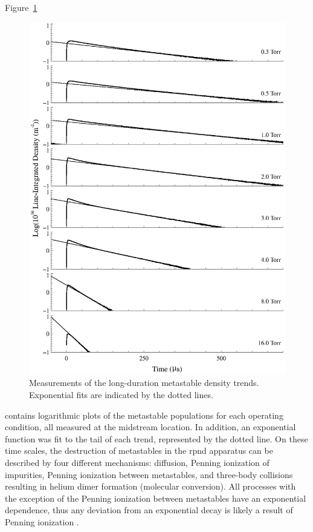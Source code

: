 Figure~\ref{fig:long}
\begin{figure}
  \centering
  \includegraphics{./chapters/metastables/figures/long.eps}
  \caption{Measurements of the long-duration metastable density trends.
  Exponential fits are indicated by the dotted lines.}
  \label{fig:long}
\end{figure}
contains logarithmic plots of the metastable populations for each operating
condition, all measured at the midstream location. In addition, an exponential
function was fit to the tail of each trend, represented by the dotted line. On
these time scales, the destruction of metastables in the \acs{rpnd} apparatus
can be described by four different mechanisms: diffusion, Penning ionization of
impurities, Penning ionization between metastables, and three-body collisions
resulting in helium dimer formation (molecular conversion). All processes with
the exception of the Penning ionization between metastables have an exponential
dependence, thus any deviation from an exponential decay is likely a result of
Penning ionization \cite{Deloche1976}.

